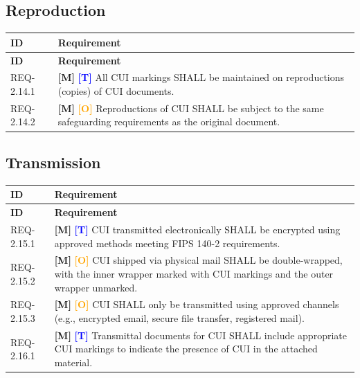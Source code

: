 \documentclass[11pt,letterpaper]{article}
\begin{document}
\subsection{Reproduction}

\begin{longtable}{@{}p{1.4cm}p{11.6cm}@{}}
\toprule
\textbf{ID} & \textbf{Requirement} \\
\midrule
\endfirsthead
\toprule
\textbf{ID} & \textbf{Requirement} \\
\midrule
\endhead

REQ-2.14.1 & \textcolor{mandatory}{\textbf{[M]}} \textcolor{blue}{\textbf{[T]}} All CUI markings SHALL be maintained on reproductions (copies) of CUI documents. \\[6pt]

REQ-2.14.2 & \textcolor{mandatory}{\textbf{[M]}} \textcolor{orange}{\textbf{[O]}} Reproductions of CUI SHALL be subject to the same safeguarding requirements as the original document. \\[6pt]

\bottomrule
\end{longtable}

\subsection{Transmission}

\begin{longtable}{@{}p{1.4cm}p{11.6cm}@{}}
\toprule
\textbf{ID} & \textbf{Requirement} \\
\midrule
\endfirsthead
\toprule
\textbf{ID} & \textbf{Requirement} \\
\midrule
\endhead

REQ-2.15.1 & \textcolor{mandatory}{\textbf{[M]}} \textcolor{blue}{\textbf{[T]}} CUI transmitted electronically SHALL be encrypted using approved methods meeting FIPS 140-2 requirements. \\[6pt]

REQ-2.15.2 & \textcolor{mandatory}{\textbf{[M]}} \textcolor{orange}{\textbf{[O]}} CUI shipped via physical mail SHALL be double-wrapped, with the inner wrapper marked with CUI markings and the outer wrapper unmarked. \\[6pt]

REQ-2.15.3 & \textcolor{mandatory}{\textbf{[M]}} \textcolor{orange}{\textbf{[O]}} CUI SHALL only be transmitted using approved channels (e.g., encrypted email, secure file transfer, registered mail). \\[6pt]

REQ-2.16.1 & \textcolor{mandatory}{\textbf{[M]}} \textcolor{blue}{\textbf{[T]}} Transmittal documents for CUI SHALL include appropriate CUI markings to indicate the presence of CUI in the attached material. \\[6pt]

\bottomrule
\end{longtable}
\end{document}
